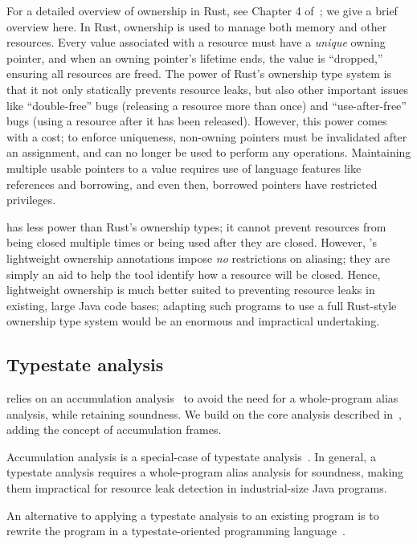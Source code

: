 For a detailed overview of ownership in Rust, see Chapter 4
of~\cite{klabnik2018rust}; we give a brief overview here.  In Rust, ownership is
used to manage both memory and other resources.  Every value associated with a
resource must have a \emph{unique} owning pointer, and when an owning pointer's
lifetime ends, the value is ``dropped,'' ensuring all resources are freed.  The
power of Rust's ownership type system is that it not only statically prevents
resource leaks, but also other important issues like ``double-free'' bugs
(releasing a resource more than once) and ``use-after-free'' bugs (using a
resource after it has been released). However, this power comes with a cost; to
enforce uniqueness, non-owning pointers must be invalidated after an assignment,
and can no longer be used to perform any operations.  Maintaining multiple
usable pointers to a value requires use of language features like references and
borrowing, and even then, borrowed pointers have restricted privileges.

\Tool has less power than Rust's ownership types; it cannot prevent resources
from being closed multiple times or being used after they are closed.  However,
\Tool's lightweight ownership annotations impose \emph{no} restrictions on
aliasing; they are simply an aid to help the tool identify how a resource will
be closed.  Hence, lightweight ownership is much better suited to preventing
resource leaks in existing, large Java code bases; adapting such programs to use
a full Rust-style ownership type system would be an enormous and impractical
undertaking.



\subsection{Typestate analysis}
\label{sec:rw-typestate}

\Tool relies on an accumulation
analysis~\cite{KelloggRSSE2020,FahndrichLeino03} to avoid the need
for a whole-program alias analysis, while retaining soundness.  We
build on the core analysis described in~\cite{KelloggRSSE2020},
adding the concept of accumulation frames.

Accumulation analysis is a special-case of typestate analysis~\cite{StromY86}.
In general, a typestate analysis requires a whole-program alias analysis
for soundness, making them impractical for resource leak detection
in industrial-size Java programs. 

An alternative to applying a typestate analysis to an existing program
is to rewrite the program in a typestate-oriented programming
language~\cite{AldrichSSS2009}.   
